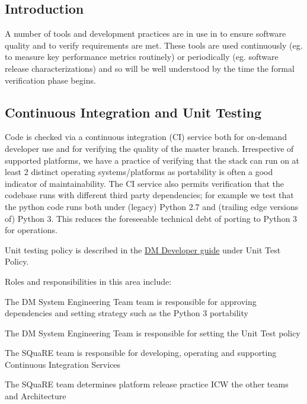 

\subsection{Introduction}

A number of tools and development practices are in use in \product to ensure software quality and to verify requirements are met. These tools are used continuously (eg. to measure key performance metrics routinely) or periodically (eg. software release characterizations) and so will be well understood by the time the formal verification phase begins.

\subsection{Continuous Integration and Unit Testing}

Code is checked via a continuous integration (CI) service both for on-demand developer use and for verifying the quality of the master branch. Irrespective of supported platforms, we have a practice of verifying that the stack can run on at least 2 distinct operating systems/platforms as portability is often a good indicator of maintainability. The CI service also permits verification that the codebase runs with different third party dependencies; for example we test that the python code runs both under (legacy) Python 2.7 and (trailing edge versions of) Python 3. This reduces the foreseeable technical debt of porting to Python 3 for operations.

Unit testing policy is described in the \href{https://developer.lsst.io}{DM Developer guide} under Unit Test Policy.

Roles and responsibilities in this area include:

\begin{itemize_single}

\item The DM System Engineering Team  team is responsible for approving dependencies and setting strategy such as the Python 3 portability

\item The DM System Engineering  Team is responsible for setting the Unit Test policy

\item The SQuaRE team is responsible for developing, operating and supporting Continuous Integration Services

\item The SQuaRE team determines platform release practice ICW the other teams and Architecture

\end{itemize_single}

